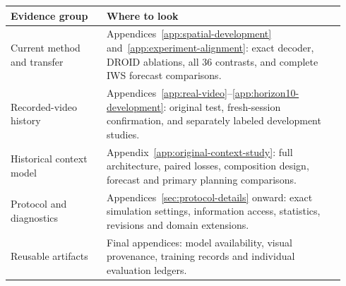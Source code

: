 \documentclass{article}
\begin{document}
\begin{center}
\begin{tabular}{@{}p{0.27\linewidth}p{0.67\linewidth}@{}}
\toprule
Evidence group & Where to look \\
\midrule
Current method and transfer & Appendices~\ref{app:spatial-development}
and~\ref{app:experiment-alignment}: exact decoder, DROID ablations,
all 36 contrasts, and complete IWS forecast comparisons.\\[3pt]
Recorded-video history & Appendices~\ref{app:real-video}--\ref{app:horizon10-development}:
original test, fresh-session confirmation, and separately labeled development studies.\\[3pt]
Historical context model & Appendix~\ref{app:original-context-study}: full architecture,
paired losses, composition design, forecast and primary planning comparisons.\\[3pt]
Protocol and diagnostics & Appendices~\ref{sec:protocol-details} onward: exact
simulation settings, information access, statistics, revisions and domain extensions.\\[3pt]
Reusable artifacts & Final appendices: model availability, visual provenance,
training records and individual evaluation ledgers.\\
\bottomrule
\end{tabular}
\end{center}

\FloatBarrier

\FloatBarrier

\FloatBarrier

\FloatBarrier

\FloatBarrier

\FloatBarrier

\FloatBarrier

\end{document}
